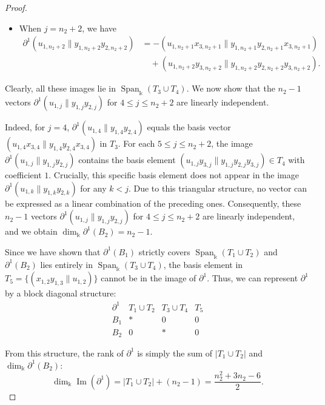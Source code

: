 \documentclass[a4paper, reqno, 11pt]{amsart}
\theoremstyle{definition}
\begin{document}
\begin{proof}
\begin{enumerate}[leftmargin=*, itemindent=0pt, labelindent=0pt, labelsep=0.5em]
\begin{itemize}[label=--]
			\item  When $j = n_2+2$, we have
			\[
			\begin{aligned}
				\partial^1(u_{1,n_2+2} \parallel y_{1,n_2+2}y_{2,n_2+2}) &= - (u_{1,n_2+1}x_{3,n_2+1} \parallel y_{1,n_2+1}y_{2,n_2+1}x_{3,n_2+1}) \\
				&\quad + (u_{1,n_2+2}y_{3,n_2+2} \parallel y_{1,n_2+2}y_{2,n_2+2}y_{3,n_2+2}).
			\end{aligned}
			\]
		\end{itemize}
		
		Clearly, all these images lie in $\operatorname{Span}_\Bbbk(T_3 \cup T_4)$. We now show that the $n_2-1$ vectors $\partial^1(u_{1,j} \parallel y_{1,j}y_{2,j})$ for $4 \le j \le n_2+2$ are linearly independent. 
		
		Indeed, for $j=4$, $\partial^1(u_{1,4} \parallel y_{1,4}y_{2,4})$ equals the basis vector $(u_{1,4}x_{3,4} \parallel y_{1,4}y_{2,4}x_{3,4})$ in $T_3$. For each $5 \le j \le n_2+2$, the image $\partial^1(u_{1,j} \parallel y_{1,j}y_{2,j})$ contains the basis element $(u_{1,j}y_{3,j} \parallel y_{1,j}y_{2,j}y_{3,j}) \in T_4$ with coefficient $1$. Crucially, this specific basis element does not appear in the image $\partial^1(u_{1,k} \parallel y_{1,k}y_{2,k})$ for any $k < j$. Due to this triangular structure, no vector can be expressed as a linear combination of the preceding ones. Consequently, these $n_2-1$ vectors $\partial^1(u_{1,j} \parallel y_{1,j}y_{2,j}) $ for $4\leq j \leq n_2+2$ are linearly independent, and we obtain \(\dim_\Bbbk \partial^1(B_2) = n_2 - 1.\)
	\end{enumerate}
	
	Since we have shown that $\partial^1(B_1)$ strictly covers $\operatorname{Span}_\Bbbk(T_1 \cup T_2)$ and $\partial^1(B_2)$ lies entirely in $\operatorname{Span}_\Bbbk(T_3 \cup T_4)$, the basis element in $T_5 = \{(x_{1,2}y_{1,3} \parallel u_{1,2})\}$ cannot be in the image of $\partial^1$. Thus, we can represent $\partial^1$ by a block diagonal structure:
	\[
	\begin{array}{c|ccc}
		\partial^1 & T_1 \cup T_2 & T_3 \cup T_4 & T_5 \\
		\hline
		B_1 & * & 0 & 0 \\
		B_2 & 0 & * & 0
	\end{array}
	\]
	
	From this structure, the rank of $\partial^1$ is simply the sum of $|T_1 \cup T_2|$ and $\dim_\Bbbk \partial^1(B_2)$:
	\[
	\dim_\Bbbk \operatorname{Im}(\partial^1) = |T_1 \cup T_2| + (n_2 - 1) = \frac{n_2^2 + 3n_2 - 6}{2}.
	\]
	

\end{proof}
\end{document}
